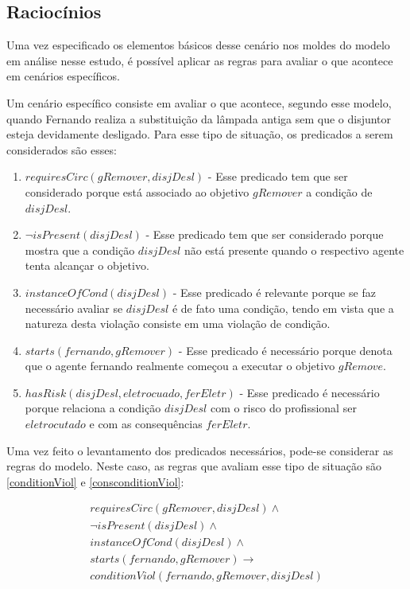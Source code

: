 \subsection{Raciocínios}

Uma vez especificado os elementos básicos desse cenário nos moldes do modelo em análise nesse estudo, é possível aplicar as regras para avaliar o que acontece em cenários específicos. 

Um cenário específico consiste em avaliar o que acontece, segundo esse modelo, quando Fernando realiza a substituição da lâmpada antiga sem que o disjuntor esteja devidamente desligado. Para esse tipo de situação, os predicados a serem considerados são esses:

\begin{enumerate}
	\item $requiresCirc(gRemover,disjDesl)$ - Esse predicado tem que ser considerado porque está associado ao objetivo $gRemover$ a condição de $disjDesl$.
	\item $\neg isPresent(disjDesl)$ - Esse predicado tem que ser considerado porque mostra que a condição $disjDesl$ não está presente quando o respectivo agente tenta alcançar o objetivo.
	\item $instanceOfCond(disjDesl)$ - Esse predicado é relevante porque se faz necessário avaliar se $disjDesl$ é de fato uma condição, tendo em vista que a natureza desta violação consiste em uma violação de condição.
	\item $starts(fernando,gRemover)$ - Esse predicado é necessário porque denota que o agente fernando realmente começou a executar o objetivo $gRemove$.
	\item $hasRisk(disjDesl, eletrocuado, ferEletr)$ - Esse predicado é necessário porque relaciona a condição $disjDesl$ com o risco do profissional ser $eletrocutado$ e com as consequências $ferEletr$.
\end{enumerate}

Uma vez feito o levantamento dos predicados necessários, pode-se considerar as regras do modelo. Neste caso, as regras que avaliam esse tipo de situação são \ref{conditionViol} e \ref{consconditionViol}:

\begin{eqnarray}\label{applicationCodViolIntrodCase}\nonumber
	requiresCirc(gRemover,disjDesl) \wedge \\ \nonumber   
	\neg isPresent(disjDesl) \wedge  \\ \nonumber   
	instanceOfCond(disjDesl) \wedge \\ \nonumber   
	starts(fernando,gRemover)  \to \\ \nonumber   
	conditionViol(fernando,gRemover,disjDesl) \nonumber \\  
\end{eqnarray}

